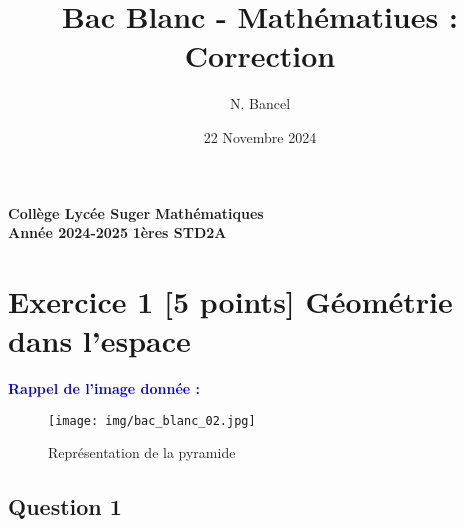 \documentclass{exam}
\title{Bac Blanc - Mathématiues : Correction}
\author{N. Bancel}
\date{22 Novembre 2024}
\begin{document}
\textbf{Collège Lycée Suger}
\hfill
\textbf{Mathématiques} \\

\textbf{Année 2024-2025}
\hfill
\textbf{1ères STD2A} \par

{\let\newpage\relax\maketitle}

\section*{Exercice 1 [5 points] Géométrie dans l'espace}

\begin{center}
  \textbf{\textcolor{blue}{Rappel de l'image donnée :}} \par
\end{center}

\begin{figure}[H]
  \centering
  \texttt{[image: img/bac\_blanc\_02.jpg]}
  \caption{\label{} Représentation de la pyramide}
\end{figure}

\subsection*{Question 1}
\end{document}
